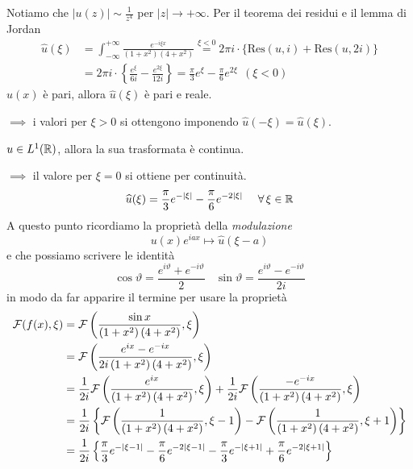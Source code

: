 Notiamo che $| u( z)| \sim \frac{1}{z^{4}}$ per $| z| \rightarrow +\infty $. Per il teorema dei residui e il lemma di Jordan
\begin{equation*}
\begin{aligned}
\hat{u}( \xi ) & =\int ^{+\infty }_{-\infty }\frac{e^{-i\xi x}}{\left( 1+x^{2}\right)\left( 4+x^{2}\right)}\overset{\xi < 0}{=} 2\pi i\cdotp \{\mathrm{Res}( u,i) +\mathrm{Res}( u,2i)\}\\
 & =2\pi i\cdotp \left\{\frac{e^{\xi }}{6i} -\frac{e^{2\xi }}{12i}\right\} =\frac{\pi }{3} e^{\xi } -\frac{\pi }{6} e^{2\xi } \ \ ( \xi < 0)
\end{aligned}
\end{equation*}
$u( x)$ è pari, allora $\hat{u}( \xi )$ è pari e reale.

$\implies $ i valori per $\xi  >0$ si ottengono imponendo $\hat{u}( -\xi ) =\hat{u}( \xi )$.

$u\in L^{1}(\mathbb{R} )$, allora la sua trasformata è continua.

$\implies $ il valore per $\xi =0$ si ottiene per continuità.
\begin{equation*}
\hat{u}( \xi ) =\frac{\pi }{3} e^{-| \xi | } -\frac{\pi }{6} e^{-2| \xi | } \ \ \ \ \forall \xi \in \RR 
\end{equation*}
A questo punto ricordiamo la proprietà della \textit{modulazione}
\begin{equation*}
u( x) e^{iax} \mapsto \hat{u}( \xi -a)
\end{equation*}
e che possiamo scrivere le identità
\begin{equation*}
\cos \vartheta =\frac{e^{i\vartheta } +e^{-i\vartheta }}{2} \ \ \ \ \sin \vartheta =\frac{e^{i\vartheta } -e^{-i\vartheta }}{2i}
\end{equation*}
in modo da far apparire il termine per usare la proprietà
\begin{equation*}
\begin{aligned}
\mathcal{F} ( f( x) ,\xi ) & =\mathcal{F} \left(\frac{\sin x}{\left( 1+x^{2}\right)\left( 4+x^{2}\right)} ,\xi \right)\\
 & =\mathcal{F} \left(\frac{e^{ix} -e^{-ix}}{2i\left( 1+x^{2}\right)\left( 4+x^{2}\right)} ,\xi \right)\\
 & =\frac{1}{2i}\mathcal{F} \left(\frac{e^{ix}}{\left( 1+x^{2}\right)\left( 4+x^{2}\right)} ,\xi \right) +\frac{1}{2i}\mathcal{F} \left(\frac{-e^{-ix}}{\left( 1+x^{2}\right)\left( 4+x^{2}\right)} ,\xi \right)\\
 & =\frac{1}{2i}\left\{\mathcal{F} \left(\frac{1}{\left( 1+x^{2}\right)\left( 4+x^{2}\right)} ,\xi -1\right) -\mathcal{F} \left(\frac{1}{\left( 1+x^{2}\right)\left( 4+x^{2}\right)} ,\xi +1\right)\right\}\\
 & =\frac{1}{2i}\left\{\frac{\pi }{3} e^{-| \xi -1| } -\frac{\pi }{6} e^{-2| \xi -1| } -\frac{\pi }{3} e^{-| \xi +1| } +\frac{\pi }{6} e^{-2| \xi +1| }\right\}
\end{aligned}
\end{equation*}
\Soluzione

